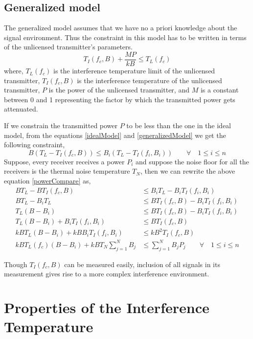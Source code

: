 \documentclass[12pt]{article}
\begin{document}
\subsection*{Generalized model}

The generalized model assumes that we have no a priori knowledge about the signal environment. Thus the constraint in this model has to be written in terms of the unlicensed transmitter's parameters.
\begin{equation}
    T_I(f_c,B) + \frac{MP}{kB} \leq T_L(f_c) \label{generalizedModel}
\end{equation}
where, $T_L(f_c)$ is the interference temperature limit of the unlicensed transmitter,
$T_I(f_c,B)$ is the interference temperature of the unlicensed transmitter, $P$ is the power of the unlicensed transmitter, and $M$ is a constant between 0 and 1 representing the factor by which the transmitted power gets attenuated.

If we constrain the transmitted power $P$ to be less than the one in the ideal model, from the equations \eqref{idealModel} and \eqref{generalizedModel} we get the following constraint,
\begin{equation}
    B(T_L - T_I(f_c,B)) \leq  B_i(T_L - T_I(f_i,B_i)) \qquad \forall \quad 1 \leq i \leq n \label{powerCompare}
\end{equation}
Suppose, every receiver receives a power $P_i$ and suppose the noise floor for all the receivers is the thermal noise temperature $T_N$, then we can rewrite the above equation \eqref{powerCompare} as,
\begin{align}
    BT_L - BT_I(f_c,B) & \leq  B_iT_L - B_iT_I(f_i,B_i) \nonumber\\  
    BT_L - B_iT_L & \leq BT_I(f_c,B) - B_iT_I(f_i,B_i) \nonumber\\  
    T_L(B- B_i) & \leq BT_I(f_c,B) - B_iT_I(f_i,B_i) \nonumber\\  
    T_L(B - B_i) + B_iT_I(f_i,B_i) & \leq  BT_I(f_c,B) \nonumber\\
    kBT_L(B - B_i) + kBB_iT_I(f_i,B_i) & \leq kB^2T_I(f_c,B) \nonumber\\  
    kBT_L(f_c)(B-B_i) + kBT_N\sum_{j=1}^{N}B_j & \leq \sum_{j=1}^{N}B_jP_j \qquad \forall \quad 1 \leq i\leq n
\end{align}

Though $T_I(f_c,B)$ can be measured easily, inclusion of all signals in its measurement gives rise to a more complex interference environment.


\section{Properties of the Interference Temperature}
\end{document}
